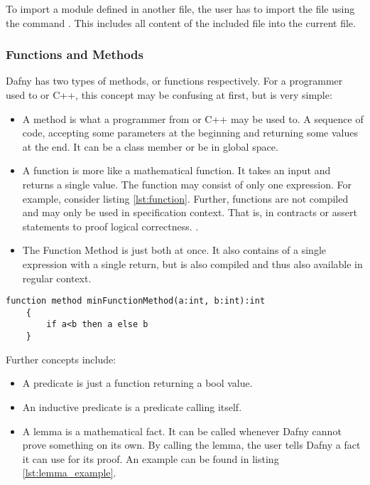 To import a module defined in another file, the user has to import the file using the command . This includes all content of the included file into the current file.

\subsubsection{Functions and Methods}
Dafny has two types of methods, or functions respectively. For a programmer used to \Csharp or C++, this concept may be confusing at first, but is very simple:
\begin{itemize}
\item A method is what a programmer from \Csharp or C++ may be used to. A sequence of code, accepting some parameters at the beginning and returning some values at the end. It can be a class member or be in global space.
\item A function is more like a mathematical function. It takes an input and returns a single value. The function may consist of only one expression. For example, consider listing \ref{lst:function}. Further, functions are not compiled and may only be used in specification context. That is, in contracts or assert statements to proof logical correctness. \cite{functionVSMethod}.
\item The Function Method is just both at once. It also contains of a single expression with a single return, but is also compiled and thus also available in regular context. \cite{functionVSMethod}
\end{itemize}

\begin{lstlisting}[caption={Function}, captionpos=b, label={lst:function}]
    function method minFunctionMethod(a:int, b:int):int
    {
        if a<b then a else b
    }
\end{lstlisting}

Further concepts include:
\begin{itemize}
\item A predicate is just a function returning a bool value.
\item An inductive predicate is a predicate calling itself.
\item A lemma is a mathematical fact. It can be called whenever Dafny cannot prove something on its own. By calling the lemma, the user tells Dafny a fact it can use for its proof. An example can be found in listing \ref{lst:lemma_example}. \cite{dafnyReferenceManual}
\end{itemize}

